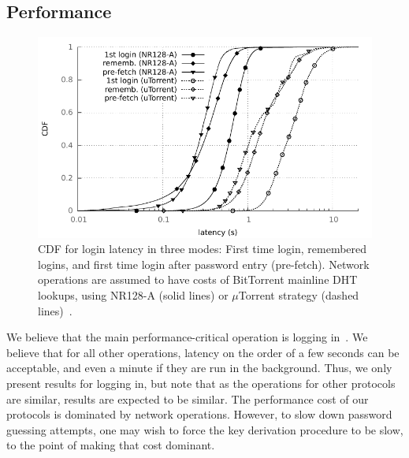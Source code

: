 \subsection{Performance}


\begin{figure}
 \centering
 \includegraphics[width=.487\textwidth]{images/passwords-peer-to-peer/latencyCDF}
 \caption{CDF for login latency in three modes: First time login,
remembered logins, and first time login after password entry (pre-fetch). Network 
operations are assumed to have costs of BitTorrent mainline DHT lookups,
using NR128-A (solid lines) or $\mu$Torrent strategy (dashed lines)~\cite{JimenezOK11}.} 
\end{figure}

We believe that the main performance-critical operation is logging
in~\cite{Rushinek86}. We believe that for all other operations,
latency on the order of a few seconds can be acceptable, and even a minute if they are run in the background. Thus, we only present results for logging in, but note
that as the operations for other protocols are similar, results are
expected to be similar. The performance cost of our protocols is
dominated by network operations. However, to slow down password
guessing attempts, one may wish to force the key derivation procedure
to be slow, to the point of making that cost dominant.

